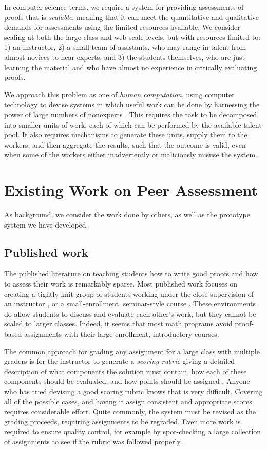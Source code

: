 \documentclass[12pt]{article}
\begin{document}
In computer science terms, we require a system for providing
assessments of proofs that is {\em scalable}, meaning that it can meet
the quantitative and qualitative demands for assessments using the
limited resources available.  We consider scaling at both the
large-class and web-scale levels, but with 
resources limited to: 1) an instructor, 2) a small team of assistants,
who may range in talent from almost novices to near experts, and 3) the
students themselves, who are just learning the material and who have
almost no experience in critically evaluating proofs.

We approach this problem as one of {\em human computation}, using
computer technology to devise systems in which useful work can be done by
harnessing the power of large numbers of nonexperts
\citep{quinn-chi11, vonahn05}.  This requires
the task to be decomposed into smaller units of work, each of which 
can be performed by the available talent pool.  It also requires
mechanisms to generate these units, supply them to the workers, and
then aggregate the results, such that the outcome is valid, even when
some of the workers either inadvertently or maliciously misuse the system.

\section{Existing Work on Peer Assessment}

As background, we consider the work done by others, as well as the
prototype system we have developed.

\subsection{Published work}

The published literature on teaching students how to write good proofs
and how to assess their work is remarkably sparse.  Most published
work focuses on creating a tightly knit group of students working
under the close supervision of an instructor
\citep{cohen-amm82,jones-amm77}, or a small-enrollment, seminar-style
course \citep{reisel-amm82}.  These environments do allow students to
discuss and evaluate each other's work, but they cannot be scaled to
larger classes.  Indeed, it seems that most math programs avoid
proof-based assignments with their large-enrollment, introductory
courses.

The common approach for grading any assignment for a large
class with multiple graders is for the instructor to generate a {\em
  scoring rubric} giving a detailed description of what components the
solution must contain, how each of these components should be
evaluated, and how points should be assigned
\citep{moskal-pa2000}.  Anyone who has tried devising a
good scoring rubric knows that is very difficult.  Covering all of the
possible cases, and having it assign consistent and appropriate scores
requires considerable effort.  Quite commonly, the system must be
revised as the grading proceeds, requiring assignments to be
regraded.  Even more work is required to ensure quality control, for
example by spot-checking a large collection of assignments to see if
the rubric was followed properly.
\end{document}
